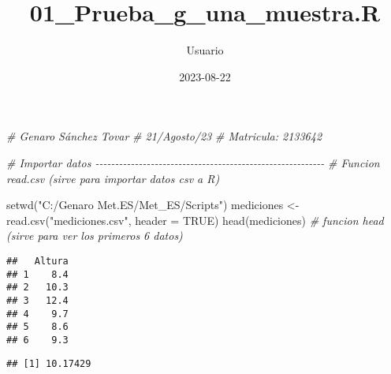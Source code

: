 \documentclass[
]{article}
\title{01\_Prueba\_g\_una\_muestra.R}
\author{Usuario}
\date{2023-08-22}
\newenvironment{Shaded}{\begin{snugshade}}{\end{snugshade}}
\newcommand{\AttributeTok}[1]{\textcolor[rgb]{0.77,0.63,0.00}{#1}}
\newcommand{\CommentTok}[1]{\textcolor[rgb]{0.56,0.35,0.01}{\textit{#1}}}
\newcommand{\ConstantTok}[1]{\textcolor[rgb]{0.00,0.00,0.00}{#1}}
\newcommand{\FunctionTok}[1]{\textcolor[rgb]{0.00,0.00,0.00}{#1}}
\newcommand{\NormalTok}[1]{#1}
\newcommand{\OtherTok}[1]{\textcolor[rgb]{0.56,0.35,0.01}{#1}}
\newcommand{\SpecialCharTok}[1]{\textcolor[rgb]{0.00,0.00,0.00}{#1}}
\newcommand{\StringTok}[1]{\textcolor[rgb]{0.31,0.60,0.02}{#1}}
\begin{document}
\maketitle

\begin{Shaded}
\begin{Highlighting}[]
\CommentTok{\# Genaro Sánchez Tovar}
\CommentTok{\# 21/Agosto/23}
\CommentTok{\# Matricula: 2133642}


\CommentTok{\# Importar datos {-}{-}{-}{-}{-}{-}{-}{-}{-}{-}{-}{-}{-}{-}{-}{-}{-}{-}{-}{-}{-}{-}{-}{-}{-}{-}{-}{-}{-}{-}{-}{-}{-}{-}{-}{-}{-}{-}{-}{-}{-}{-}{-}{-}{-}{-}{-}{-}{-}{-}{-}{-}{-}{-}{-}{-}{-}{-}}
\CommentTok{\# Funcion read.csv (sirve para importar datos csv a R)}

\FunctionTok{setwd}\NormalTok{(}\StringTok{"C:/Genaro Met.ES/Met\_ES/Scripts"}\NormalTok{)}
\NormalTok{mediciones }\OtherTok{\textless{}{-}} \FunctionTok{read.csv}\NormalTok{(}\StringTok{"mediciones.csv"}\NormalTok{, }\AttributeTok{header =} \ConstantTok{TRUE}\NormalTok{)}
\FunctionTok{head}\NormalTok{(mediciones) }\CommentTok{\# funcion head (sirve para ver los primeros 6 datos)}
\end{Highlighting}
\end{Shaded}

\begin{verbatim}
##   Altura
## 1    8.4
## 2   10.3
## 3   12.4
## 4    9.7
## 5    8.6
## 6    9.3
\end{verbatim}

\begin{Shaded}
\end{Shaded}

\begin{verbatim}
## [1] 10.17429
\end{verbatim}

\begin{Shaded}
\end{Shaded}
\end{document}
